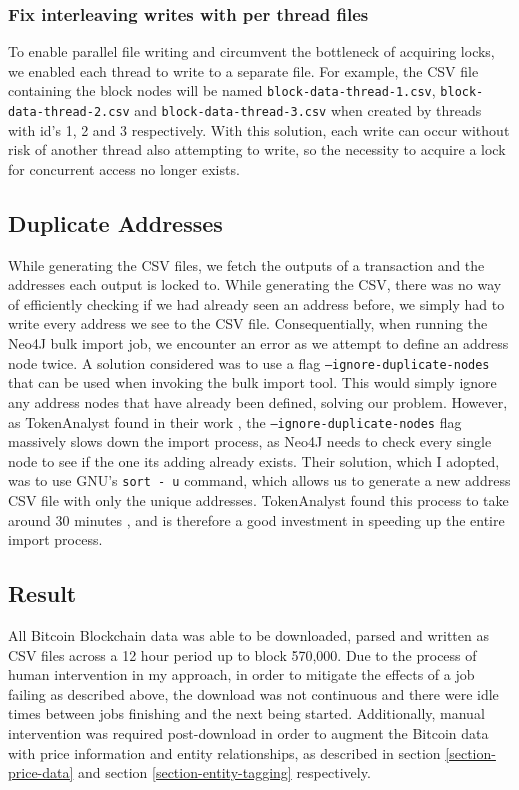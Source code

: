 \subsubsection{Fix interleaving writes with per thread files} 
To enable parallel file writing and circumvent the bottleneck of acquiring locks, we enabled each thread to write to a separate file. For example, the CSV file containing the block nodes will be named \texttt{block-data-thread-1.csv}, \texttt{block-data-thread-2.csv} and \texttt{block-data-thread-3.csv} when created by threads with id's 1, 2 and 3 respectively. With this solution, each write can occur without risk of another thread also attempting to write, so the necessity to acquire a lock for concurrent access no longer exists. 

\subsection{Duplicate Addresses}
While generating the CSV files, we fetch the outputs of a transaction and the addresses each output is locked to. While generating the CSV, there was no way of efficiently checking if we had already seen an address before, we simply had to write every address we see to the CSV file. Consequentially, when running the Neo4J bulk import job, we encounter an error as we attempt to define an address node twice. A solution considered was to use a flag \texttt{--ignore-duplicate-nodes} that can be used when invoking the bulk import tool. This would simply ignore any address nodes that have already been defined, solving our problem. However, as TokenAnalyst found in their work \cite{RefWorks:doc:5c98e0cde4b044512c0b8641}, the \texttt{--ignore-duplicate-nodes} flag massively slows down the import process, as Neo4J needs to check every single node to see if the one its adding already exists. Their solution, which I adopted, was to use GNU's \texttt{sort - u} command, which allows us to generate a new address CSV file with only the unique addresses. TokenAnalyst found this process to take around 30 minutes \cite{RefWorks:doc:5c98e0cde4b044512c0b8641}, and is therefore a good investment in speeding up the entire import process. 


\subsection{Result}
All Bitcoin Blockchain data was able to be downloaded, parsed and written as CSV files across a 12 hour period up to block 570,000. Due to the process of human intervention in my approach, in order to mitigate the effects of a job failing as described above, the download was not continuous and there were idle times between jobs finishing and the next being started. Additionally, manual intervention was required post-download in order to augment the Bitcoin data with price information and entity relationships, as described in section \ref{section-price-data} and section \ref{section-entity-tagging} respectively. 